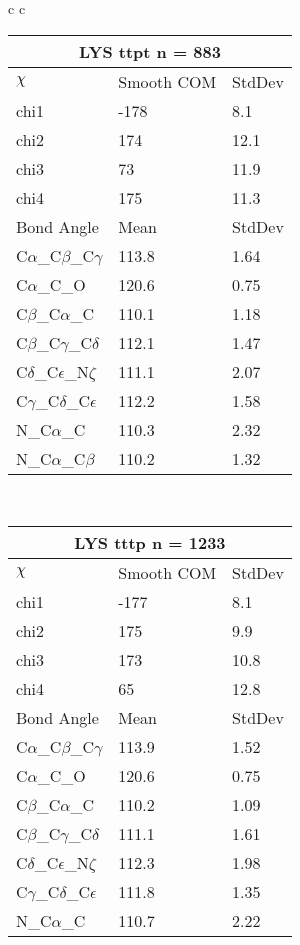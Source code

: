 \begin{longtable}{ c c }
  \begin{tabular}{ l l l }
  \toprule
  \multicolumn{3}{c}{LYS \textbf{ttpt} n = 883} \\ \toprule
  $\chi$       & Smooth COM & StdDev \\ \midrule
  chi1 & -178 & 8.1 \\ 
  chi2 & 174 & 12.1 \\ 
  chi3 & 73 & 11.9 \\ 
  chi4 & 175 & 11.3 \\ \midrule
  Bond Angle   & Mean     & StdDev \\ \midrule
  C$\alpha$\_C$\beta$\_C$\gamma$ & 113.8 & 1.64\\
  C$\alpha$\_C\_O & 120.6 & 0.75\\
  C$\beta$\_C$\alpha$\_C & 110.1 & 1.18\\
  C$\beta$\_C$\gamma$\_C$\delta$ & 112.1 & 1.47\\
  C$\delta$\_C$\epsilon$\_N$\zeta$ & 111.1 & 2.07\\
  C$\gamma$\_C$\delta$\_C$\epsilon$ & 112.2 & 1.58\\
  N\_C$\alpha$\_C & 110.3 & 2.32\\
  N\_C$\alpha$\_C$\beta$ & 110.2 & 1.32\\
  \bottomrule
  \end{tabular}
  \\
  \begin{tabular}{ l l l }
  \toprule
  \multicolumn{3}{c}{LYS \textbf{tttp} n = 1233} \\ \toprule
  $\chi$       & Smooth COM & StdDev \\ \midrule
  chi1 & -177 & 8.1 \\ 
  chi2 & 175 & 9.9 \\ 
  chi3 & 173 & 10.8 \\ 
  chi4 & 65 & 12.8 \\ \midrule
  Bond Angle   & Mean     & StdDev \\ \midrule
  C$\alpha$\_C$\beta$\_C$\gamma$ & 113.9 & 1.52\\
  C$\alpha$\_C\_O & 120.6 & 0.75\\
  C$\beta$\_C$\alpha$\_C & 110.2 & 1.09\\
  C$\beta$\_C$\gamma$\_C$\delta$ & 111.1 & 1.61\\
  C$\delta$\_C$\epsilon$\_N$\zeta$ & 112.3 & 1.98\\
  C$\gamma$\_C$\delta$\_C$\epsilon$ & 111.8 & 1.35\\
  N\_C$\alpha$\_C & 110.7 & 2.22\\

\end{tabular}
\end{longtable}
